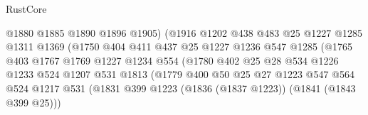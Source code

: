 \begin{lexlean}{RustCore}
\begin{coremodule}
                                    @1880
                                    @1885
                                    @1890
                                    @1896
                                    @1905)
                                  (@1916
                                    @1202
                                    @438
                                    @483
                                    @25
                                    @1227
                                    @1285
                                    @1311
                                    @1369
                                    (@1750
                                      @404
                                      @411
                                      @437
                                      @25
                                      @1227
                                      @1236
                                      @547
                                      @1285
                                      (@1765
                                        @403
                                        @1767
                                        @1769
                                        @1227
                                        @1234
                                        @554
                                        (@1780
                                          @402
                                          @25
                                          @28
                                          @534
                                          @1226
                                          @1233
                                          @524
                                          @1207
                                          @531
                                          @1813
                                          (@1779
                                            @400
                                            @50
                                            @25
                                            @27
                                            @1223
                                            @547
                                            @564
                                            @524
                                            @1217
                                            @531
                                            (@1831
                                              @399
                                              @1223
                                              (@1836 (@1837 @1223))
                                              (@1841 (@1843 @399 @25)))

\end{coremodule}
\end{lexlean}
